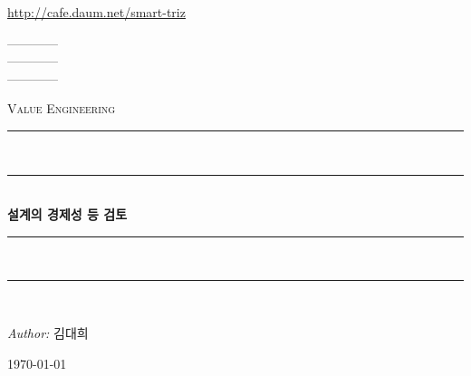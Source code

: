 \documentclass[12pt,a4paper]{book}
\begin{document}
		\url{http://cafe.daum.net/smart-triz}
		
		
		
		\newpage
		
				
		
		

		\hspace{2cm} ------------ \\
		\hspace*{4cm} ------------ \\
		\hspace*{6cm} ------------ \\




		\begin{titlepage}
		\singlespace
		\pagestyle{empty}
		\newcommand{\HRule}{\rule{\textwidth}{0.5mm}}
		\begin{center}
		\null
		\vspace{2cm}
		\textsc{\LARGE Value Engineering}\\[1.0cm]
		\HRule\\[-0.4cm]
		\HRule \\[0.4cm]
			{ \huge \bfseries 설계의 경제성 등 검토 \\[0.4cm] }
		\HRule\\[-0.4cm]
		\HRule \\[1.5cm]
		
		\noindent
		\begin{minipage}{1\textwidth}
			\begin{flushright} \large \emph{Author:}  김대희	\end{flushright}
		\end{minipage}%
		\vfill
		{\large \today}
		
		\end{center}
		\cleardoublepage
		\end{titlepage}																						







		
\end{document}
